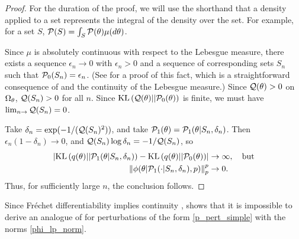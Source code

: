 \begin{thm}
\begin{proof}
For the duration of the proof, we will use the shorthand that a density
applied to a set represents the integral of the density over the set.
For example, for a set $S$, $\mathcal{P}(S) = \int_S \mathcal{P}(\theta)\mu(d\theta)$.

Since $\mu$ is absolutely continuous with respect to the Lebesgue measure, there
exists a sequence $\epsilon_n \rightarrow 0$ with $\epsilon_n > 0$ and a
sequence of corresponding sets $S_n$ such that $\mathcal{P}_{0}(S_n) = \epsilon_n$. (See
 for a proof of this fact, which is a
straightforward consequence of \citet[Proposition 15.5]{nielsen:1997:measure}
and the continuity of the Lebesgue measure.) Since $\mathcal{Q}(\theta) > 0$ on
$\Omega_{\theta}$, $\mathcal{Q}(S_n) > 0$ for all $n$.  Since $\mathrm{KL}\left(\mathcal{Q}(\theta) ||
\mathcal{P}_{0}(\theta)\right)$ is finite, we must have $\lim_{n \rightarrow} \mathcal{Q}(S_n) = 0$.

Take $\delta_n  = \exp(-1 / (\mathcal{Q}(S_n)^2))$, and take $\mathcal{P}_{1}(\theta) =
\mathcal{P}_{1}(\theta \vert S_n, \delta_n)$.  Then $\epsilon_n (1 - \delta_n) \rightarrow
0$, and $\mathcal{Q}(S_n)\log \delta_n = -1 / \mathcal{Q}(S_n)$, so
%
\begin{align*}
%
\abs{\KL{q(\theta) || \palt(\theta \vert S_n, \delta_n)} -
    \KL{q(\theta) || \pbase(\theta)}} \rightarrow{}& \infty, \quad \textrm{but}\\
%
\norm{\phi(\theta \vert \palt(\cdot \vert S_n, \delta_n), p)}_p^p
    \rightarrow{}& 0.
%
\end{align*}
%
Thus, for sufficiently large $n$, the conclusion follows.
%
\end{proof}
%
\end{thm}

Since Fr{\'e}chet differentiability implies continuity \citep[Proposition 4.8
(d)]{zeidler:2013:functional},  shows that it is
impossible to derive an analogue of  for perturbations of
the form \eqref{p_pert_simple} with the norms \eqref{phi_lp_norm}.

